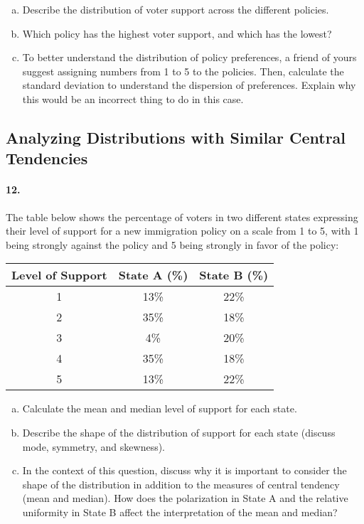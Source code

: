 \documentclass{article}
\begin{document}
\begin{enumerate}[a)]
    \item Describe the distribution of voter support across the different policies.
    \item Which policy has the highest voter support, and which has the lowest?
    \item To better understand the distribution of policy preferences, a friend of yours suggest assigning numbers from 1 to 5 to the policies. Then, calculate the standard deviation to understand the dispersion of preferences. Explain why this would be an incorrect thing to do in this case.
\end{enumerate}

\subsection*{Analyzing Distributions with Similar Central Tendencies}
\paragraph{12.} The table below shows the percentage of voters in two different states expressing their level of support for a new immigration policy on a scale from 1 to 5, with 1 being strongly against the policy and 5 being strongly in favor of the policy:

\begin{center}
    \begin{tabular}{|c|c|c|}
    \hline
    Level of Support & State A (\%) & State B (\%) \\
    \hline
    1 & 13\% & 22\% \\
    2 & 35\% & 18\% \\
    3 & 4\% & 20\% \\
    4 & 35\% & 18\% \\
    5 & 13\% & 22\% \\
    \hline
    \end{tabular}
\end{center}

\begin{enumerate}[a)]
    \item Calculate the mean and median level of support for each state.
    \item Describe the shape of the distribution of support for each state (discuss mode, symmetry, and skewness).
    \item In the context of this question, discuss why it is important to consider the shape of the distribution in addition to the measures of central tendency (mean and median). How does the polarization in State A and the relative uniformity in State B affect the interpretation of the mean and median?
\end{enumerate}
\end{document}
